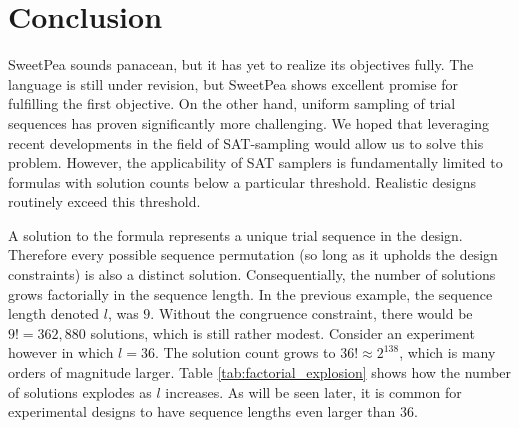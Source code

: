 \section{Conclusion}

SweetPea sounds panacean, but it has yet to realize its objectives fully. The language is still under revision, but SweetPea shows excellent promise for fulfilling the first objective. On the other hand, uniform sampling of trial sequences has proven significantly more challenging. We hoped that leveraging recent developments in the field of SAT-sampling would allow us to solve this problem. However, the applicability of SAT samplers is fundamentally limited to formulas with solution counts below a particular threshold. Realistic designs routinely exceed this threshold.

A solution to the formula represents a unique trial sequence in the design. Therefore every possible sequence permutation (so long as it upholds the design constraints) is also a distinct solution. Consequentially, the number of solutions grows factorially in the sequence length. In the previous example, the sequence length denoted $l$, was $9$. Without the congruence constraint, there would be $9! = 362,880$ solutions, which is still rather modest. Consider an experiment however in which $l = 36$. The solution count grows to $36! \approx 2^{138}$, which is many orders of magnitude larger. Table \ref{tab:factorial_explosion} shows how the number of solutions explodes as $l$ increases. As will be seen later, it is common for experimental designs to have sequence lengths even larger than 36.

